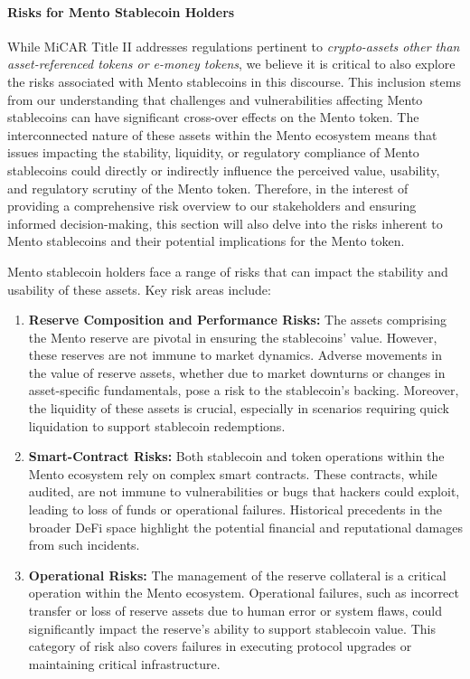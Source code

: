 \documentclass[a4paper]{article}
\theoremstyle{definition}
\begin{document}
\begin{appendices}
\paragraph{Risks for Mento Stablecoin Holders}
While MiCAR Title II addresses regulations pertinent to \textit{crypto-assets other than asset-referenced tokens or e-money tokens}, we believe it is critical to also explore the risks associated with Mento stablecoins in this discourse. This inclusion stems from our understanding that challenges and vulnerabilities affecting Mento stablecoins can have significant cross-over effects on the Mento token. The interconnected nature of these assets within the Mento ecosystem means that issues impacting the stability, liquidity, or regulatory compliance of Mento stablecoins could directly or indirectly influence the perceived value, usability, and regulatory scrutiny of the Mento token. Therefore, in the interest of providing a comprehensive risk overview to our stakeholders and ensuring informed decision-making, this section will also delve into the risks inherent to Mento stablecoins and their potential implications for the Mento token.

Mento stablecoin holders face a range of risks that can impact the stability and usability of these assets. Key risk areas include:

\begin{enumerate}
    
    \item \textbf{Reserve Composition and Performance Risks:} The assets comprising the Mento reserve are pivotal in ensuring the stablecoins' value. However, these reserves are not immune to market dynamics. Adverse movements in the value of reserve assets, whether due to market downturns or changes in asset-specific fundamentals, pose a risk to the stablecoin's backing. Moreover, the liquidity of these assets is crucial, especially in scenarios requiring quick liquidation to support stablecoin redemptions.

    \item \textbf{Smart-Contract Risks:} Both stablecoin and token operations within the Mento ecosystem rely on complex smart contracts. These contracts, while audited, are not immune to vulnerabilities or bugs that hackers could exploit, leading to loss of funds or operational failures. Historical precedents in the broader DeFi space highlight the potential financial and reputational damages from such incidents.
    
    \item \textbf{Operational Risks:} The management of the reserve collateral is a critical operation within the Mento ecosystem. Operational failures, such as incorrect transfer or loss of reserve assets due to human error or system flaws, could significantly impact the reserve's ability to support stablecoin value. This category of risk also covers failures in executing protocol upgrades or maintaining critical infrastructure.


\end{enumerate}
\end{appendices}
\end{document}
